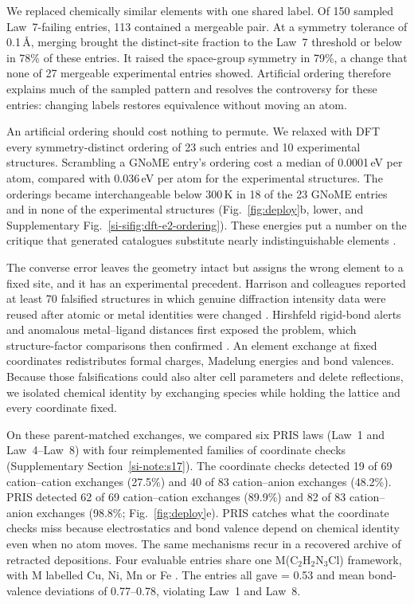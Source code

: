 We replaced chemically similar elements with one shared label. Of 150
sampled Law~7-failing entries, 113 contained a mergeable pair. At a symmetry tolerance of
0.1\,\AA{}, merging brought the distinct-site fraction to the Law~7 threshold or below in 78\% of
these entries. It raised the space-group symmetry in 79\%, a change that none of 27
mergeable experimental entries showed. Artificial ordering therefore explains much of the
sampled pattern and resolves the controversy for these entries: changing labels restores
equivalence without moving an atom.

An artificial ordering should cost nothing to permute. We relaxed with DFT every
symmetry-distinct ordering of 23 such entries and 10 experimental structures. Scrambling a
GNoME entry's ordering cost a median of 0.0001\,eV per atom, compared with 0.036\,eV per
atom for the experimental structures. The orderings became
interchangeable below 300\,K in 18 of the 23 GNoME entries and in none of the experimental
structures
(Fig.~\ref{fig:deploy}b, lower, and Supplementary
Fig.~\ref{si-sifig:dft-e2-ordering}). These energies put a number on the critique that generated catalogues substitute
nearly indistinguishable elements \cite{smit2026dataonly}.

The converse error leaves the geometry intact but assigns the wrong element to a fixed
site, and it has an experimental precedent. Harrison and colleagues reported at least 70
falsified structures in which genuine diffraction intensity data were reused after atomic
or metal identities were changed \cite{harrison2010falsified}. Hirshfeld rigid-bond alerts
and anomalous metal--ligand distances first exposed the problem, which structure-factor
comparisons then confirmed \cite{harrison2010falsified}. An element exchange at fixed coordinates redistributes formal charges, Madelung energies
and bond valences. Because those falsifications could also alter cell parameters and delete
reflections, we isolated chemical identity by exchanging species while holding the lattice
and every coordinate fixed.

On these parent-matched exchanges, we compared six PRIS laws (Law~1 and Law~4--Law~8)
with four reimplemented families of coordinate checks \cite{spek2009structure}
(Supplementary Section~\ref{si-note:s17}). The coordinate checks detected 19 of 69
cation--cation exchanges (27.5\%) and 40 of 83 cation--anion exchanges (48.2\%).
PRIS detected 62 of 69 cation--cation exchanges (89.9\%) and 82 of 83 cation--anion
exchanges (98.8\%; Fig.~\ref{fig:deploy}e). PRIS catches what the coordinate checks miss because electrostatics and bond valence
depend on chemical identity even when no atom moves.
The same mechanisms recur in a recovered archive of retracted depositions. Four evaluable
entries share one M(C$_2$H$_2$N$_3$Cl) framework, with M labelled Cu, Ni, Mn or Fe
\cite{iucr2012retraction}. The entries all gave \rhoc{} = 0.53 and mean bond-valence
deviations of 0.77--0.78, violating Law~1 and Law~8.

